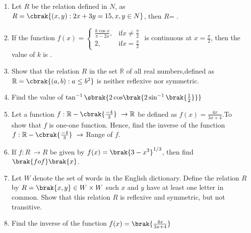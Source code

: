 %
\begin{enumerate}
\item Let $R$ be the relation defined in $N$, as
$R = \cbrak{(x, y) : 2x + 3y = 15, x, y \in N}$, then $R$=  \cbrak{\underline{\hspace{1cm}},\underline{\hspace{1cm}}}.
\item If the function $f(x)=\begin{cases}\frac{k\cos{x}}{\pi - 2x}, & \text{if} x \neq \frac{\pi}{2}\\\text{2},&\text{if} x=\frac{\pi}{2}\end{cases}$  is continuous  at $x=\frac{\pi}{2}$, then the value of $k$ is {\underline{\hspace{1cm}}}.
\item Show that the relation $R$ in the set $\mathbb{R}$ of all real numbers,defined as $\mathbb{R}=\cbrak{(a, b) : a \leq b^2}$ is neither reflexive nor symmetric.
\item Find the value of $\tan^{-1}\sbrak{{2\cos}\brak{2 \sin^{-1}\brak{\frac{1}{2}}}}$
\item Let a function $f:\mathbb{R}-\cbrak{\frac{-4}{3}}\ \to \mathbb{R}$ be defined as $f(x)=\frac{4x}{3x+4}$.To show that $f$ is one-one function. Hence, find the inverse of the function $f:\mathbb{R}-\cbrak{\frac{-4}{3}} \ \to$ Range\hspace{0.25em} of $f$.
\item If $f:R\ \to R$ be given by $f(x)=\brak{3-x^3}^{1/3}$, then find $\brak{fof}\brak{x}$.
\item Let $W$ denote the set of words in the English dictionary. Define the relation $R$ by
$R={\brak{x,y}}\in W \times W$  such $x$ and $y$ have at least one letter in common. Show that this relation $R$ is reflexive and symmetric, but not transitive.
\item Find the inverse of the function $f(x)=\brak{\frac{4x}{3x+4}}$




\end{enumerate}
